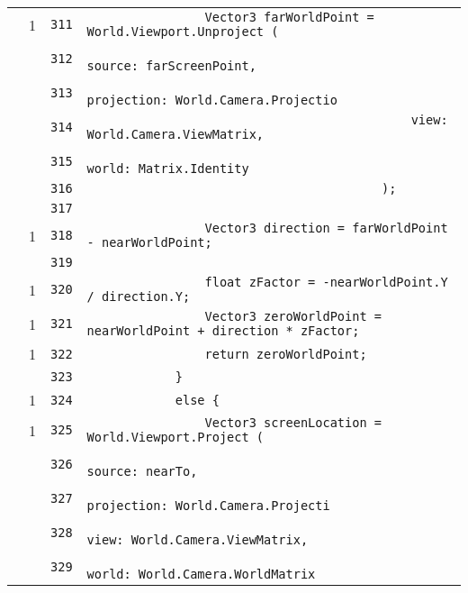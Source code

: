 \documentclass[a4paper,10pt]{article}
\begin{document}
\begin{longtable}[l]{lrrl}
\cellcolor{green} & 1 & \verb~311~ & \verb~                Vector3 farWorldPoint = World.Viewport.Unproject (~\\
\cellcolor{gray} &  & \verb~312~ & \verb~                                            source: farScreenPoint,~\\
\cellcolor{gray} &  & \verb~313~ & \verb~                                            projection: World.Camera.Projectio~\\
\cellcolor{gray} &  & \verb~314~ & \verb~                                            view: World.Camera.ViewMatrix,~\\
\cellcolor{gray} &  & \verb~315~ & \verb~                                            world: Matrix.Identity~\\
\cellcolor{gray} &  & \verb~316~ & \verb~                                        );~\\
\cellcolor{gray} &  & \verb~317~ & \verb~~\\
\cellcolor{green} & 1 & \verb~318~ & \verb~                Vector3 direction = farWorldPoint - nearWorldPoint;~\\
\cellcolor{gray} &  & \verb~319~ & \verb~~\\
\cellcolor{green} & 1 & \verb~320~ & \verb~                float zFactor = -nearWorldPoint.Y / direction.Y;~\\
\cellcolor{green} & 1 & \verb~321~ & \verb~                Vector3 zeroWorldPoint = nearWorldPoint + direction * zFactor;~\\
\cellcolor{green} & 1 & \verb~322~ & \verb~                return zeroWorldPoint;~\\
\cellcolor{gray} &  & \verb~323~ & \verb~            }~\\
\cellcolor{green} & 1 & \verb~324~ & \verb~            else {~\\
\cellcolor{green} & 1 & \verb~325~ & \verb~                Vector3 screenLocation = World.Viewport.Project (~\\
\cellcolor{gray} &  & \verb~326~ & \verb~                                             source: nearTo,~\\
\cellcolor{gray} &  & \verb~327~ & \verb~                                             projection: World.Camera.Projecti~\\
\cellcolor{gray} &  & \verb~328~ & \verb~                                             view: World.Camera.ViewMatrix,~\\
\cellcolor{gray} &  & \verb~329~ & \verb~                                             world: World.Camera.WorldMatrix~\\

\end{longtable}
\end{document}

